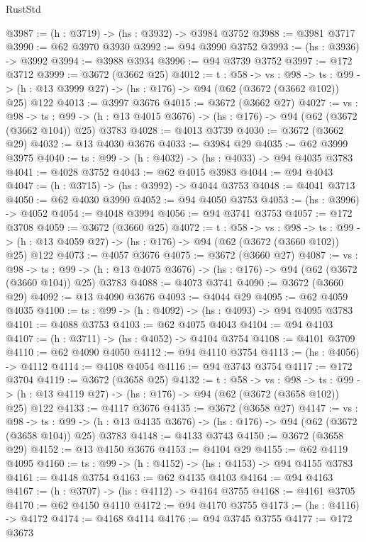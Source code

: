 \begin{lexlean}{RustStd}
\begin{coremodule}
{\begin{coremodule}
{{{{{{{{{{{@3987 := (h : @3719) -> (hs : @3932) -> @3984 @3752
@3988 := @3981 @3717
@3990 := @62 @3970 @3930
@3992 := @94 @3990 @3752
@3993 := (hs : @3936) -> @3992
@3994 := @3988 @3934
@3996 := @94 @3739 @3752
@3997 := @172 @3712
@3999 := @3672 (@3662 @25)
@4012 := {t : @58} ->
  {vs : @98} ->
  {ts : @99} -> (h : @13 @3999 @27) -> (hs : @176) -> @94 (@62 (@3672 (@3662 @102)) @25) @122
@4013 := @3997 @3676
@4015 := @3672 (@3662 @27)
@4027 := {vs : @98} ->
  {ts : @99} -> (h : @13 @4015 @3676) -> (hs : @176) -> @94 (@62 (@3672 (@3662 @104)) @25) @3783
@4028 := @4013 @3739
@4030 := @3672 (@3662 @29)
@4032 := @13 @4030 @3676
@4033 := @3984 @29
@4035 := @62 @3999 @3975
@4040 := {ts : @99} -> (h : @4032) -> (hs : @4033) -> @94 @4035 @3783
@4041 := @4028 @3752
@4043 := @62 @4015 @3983
@4044 := @94 @4043
@4047 := (h : @3715) -> (hs : @3992) -> @4044 @3753
@4048 := @4041 @3713
@4050 := @62 @4030 @3990
@4052 := @94 @4050 @3753
@4053 := (hs : @3996) -> @4052
@4054 := @4048 @3994
@4056 := @94 @3741 @3753
@4057 := @172 @3708
@4059 := @3672 (@3660 @25)
@4072 := {t : @58} ->
  {vs : @98} ->
  {ts : @99} -> (h : @13 @4059 @27) -> (hs : @176) -> @94 (@62 (@3672 (@3660 @102)) @25) @122
@4073 := @4057 @3676
@4075 := @3672 (@3660 @27)
@4087 := {vs : @98} ->
  {ts : @99} -> (h : @13 @4075 @3676) -> (hs : @176) -> @94 (@62 (@3672 (@3660 @104)) @25) @3783
@4088 := @4073 @3741
@4090 := @3672 (@3660 @29)
@4092 := @13 @4090 @3676
@4093 := @4044 @29
@4095 := @62 @4059 @4035
@4100 := {ts : @99} -> (h : @4092) -> (hs : @4093) -> @94 @4095 @3783
@4101 := @4088 @3753
@4103 := @62 @4075 @4043
@4104 := @94 @4103
@4107 := (h : @3711) -> (hs : @4052) -> @4104 @3754
@4108 := @4101 @3709
@4110 := @62 @4090 @4050
@4112 := @94 @4110 @3754
@4113 := (hs : @4056) -> @4112
@4114 := @4108 @4054
@4116 := @94 @3743 @3754
@4117 := @172 @3704
@4119 := @3672 (@3658 @25)
@4132 := {t : @58} ->
  {vs : @98} ->
  {ts : @99} -> (h : @13 @4119 @27) -> (hs : @176) -> @94 (@62 (@3672 (@3658 @102)) @25) @122
@4133 := @4117 @3676
@4135 := @3672 (@3658 @27)
@4147 := {vs : @98} ->
  {ts : @99} -> (h : @13 @4135 @3676) -> (hs : @176) -> @94 (@62 (@3672 (@3658 @104)) @25) @3783
@4148 := @4133 @3743
@4150 := @3672 (@3658 @29)
@4152 := @13 @4150 @3676
@4153 := @4104 @29
@4155 := @62 @4119 @4095
@4160 := {ts : @99} -> (h : @4152) -> (hs : @4153) -> @94 @4155 @3783
@4161 := @4148 @3754
@4163 := @62 @4135 @4103
@4164 := @94 @4163
@4167 := (h : @3707) -> (hs : @4112) -> @4164 @3755
@4168 := @4161 @3705
@4170 := @62 @4150 @4110
@4172 := @94 @4170 @3755
@4173 := (hs : @4116) -> @4172
@4174 := @4168 @4114
@4176 := @94 @3745 @3755
@4177 := @172 @3673
}}}}}}}}}}}
\end{coremodule}}
\end{coremodule}
\end{lexlean}
